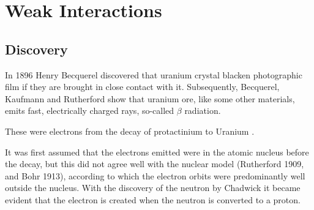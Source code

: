 
\section{Weak Interactions}

\subsection{Discovery}
 In 1896 Henry Becquerel discovered that uranium crystal blacken
 photographic film if they are brought in close contact with
 it. Subsequently, Becquerel, Kaufmann and Rutherford show that
 uranium ore, like some other materials, emits fast, electrically charged
 rays, so-called $\beta$ radiation.

 These were electrons from the decay of protactinium
  to Uranium . 

 It was first assumed that the electrons emitted were in the atomic
 nucleus before the decay, but this did not agree well with the
 nuclear model (Rutherford 1909, and Bohr 1913), according to which
 the electron orbits were predominantly well outside the nucleus. With the
 discovery of the neutron by Chadwick it became evident that the
 electron is created when the neutron is converted to a proton.


